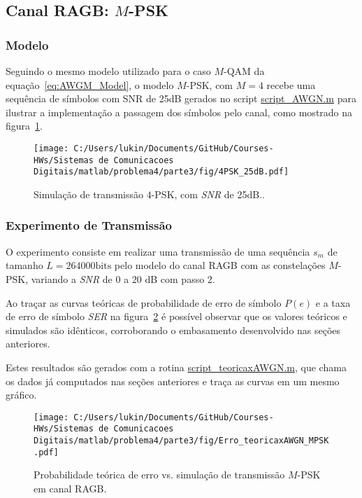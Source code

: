 \clearpage

\subsection{Canal RAGB: \texorpdfstring{$M$}{M}-PSK}
\subsubsection{Modelo}


Seguindo o mesmo modelo utilizado para o caso $M$-QAM da equação~\ref{eq:AWGM_Model}, o modelo $M$-PSK, com $M = 4$ recebe uma sequência de símbolos com SNR de 25dB gerados no script \href{https://raw.githubusercontent.com/lucasabdalah/Courses-HWs/SCD/Sistemas%20de%20Comunicacoes%20Digitais/matlab/problema4/parte3/script_AWGN.m}{\colorbox{gray!10}{\color{red} script\_AWGN.m}} para ilustrar a implementação a passagem dos símbolos pelo canal, como mostrado na figura~\ref{fig:4PSK_25dB}.

\begin{figure}[!ht]
    \centering
    \texttt{[image: C:/Users/lukin/Documents/GitHub/Courses-HWs/Sistemas de Comunicacoes Digitais/matlab/problema4/parte3/fig/4PSK\_25dB.pdf]}
    \caption{Simulação de transmissão $4$-PSK, com \textit{SNR} de 25dB..}
    \label{fig:4PSK_25dB}
\end{figure}

\subsubsection{Experimento de Transmissão}

 O experimento consiste em realizar uma transmissão de uma sequência $s_m$ de tamanho $L = 264000 \text{bits}$ pelo modelo do canal RAGB com as constelações $M$-PSK, variando a \textit{SNR} de 0 a 20 dB com passo 2.

Ao traçar as curvas teóricas de probabilidade de erro de símbolo $P(e)$ e a taxa de erro de símbolo \textit{SER} na figura~\ref{fig:Erro_teoricaxAWGN_MPSK} é possível observar que os valores teóricos e simulados são idênticos, corroborando o embasamento desenvolvido nas seções anteriores.

Estes resultados são gerados com a rotina \href{https://raw.githubusercontent.com/lucasabdalah/Courses-HWs/SCD/Sistemas%20de%20Comunicacoes%20Digitais/matlab/problema4/parte3/script_teoricaxAWGN.m}{\colorbox{gray!10}{\color{red} script\_teoricaxAWGN.m}}, que chama os dados já computados nas seções anteriores e traça as curvas em um mesmo gráfico.

\clearpage
\begin{figure}[!ht]
    \centering
    \texttt{[image: C:/Users/lukin/Documents/GitHub/Courses-HWs/Sistemas de Comunicacoes Digitais/matlab/problema4/parte3/fig/Erro\_teoricaxAWGN\_MPSK.pdf]}
    \caption{Probabilidade teórica de erro vs. simulação de transmissão $M$-PSK em canal RAGB.}
    \label{fig:Erro_teoricaxAWGN_MPSK}
\end{figure}
